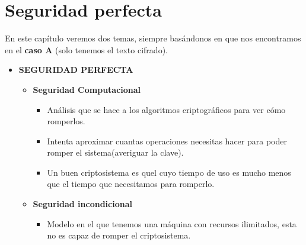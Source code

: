  \section{Seguridad perfecta}
 
 En este capítulo veremos dos temas, siempre basándonos en que nos encontramos en el \textbf{caso A} (solo tenemos el texto cifrado).
 
 \begin{itemize}
 	\item \textbf{SEGURIDAD PERFECTA}
 	\begin{itemize}
 		\item \textbf{Seguridad Computacional}
 		\begin{itemize}
 			\item Análisis que se hace a los algoritmos criptográficos para ver cómo romperlos.
 			\item  Intenta aproximar cuantas operaciones necesitas hacer para poder romper el sistema(averiguar la clave).
 			\item Un buen criptosistema es quel cuyo tiempo de uso es mucho menos que el tiempo que necesitamos para romperlo.
 			
 		\end{itemize} 

 		\item \textbf{Seguridad incondicional}
 		\begin{itemize}
 			\item Modelo en el que tenemos una máquina con recursos ilimitados, esta no es capaz de romper el criptosistema.
 		\end{itemize}
 	\end{itemize}
 	
 \end{itemize}


